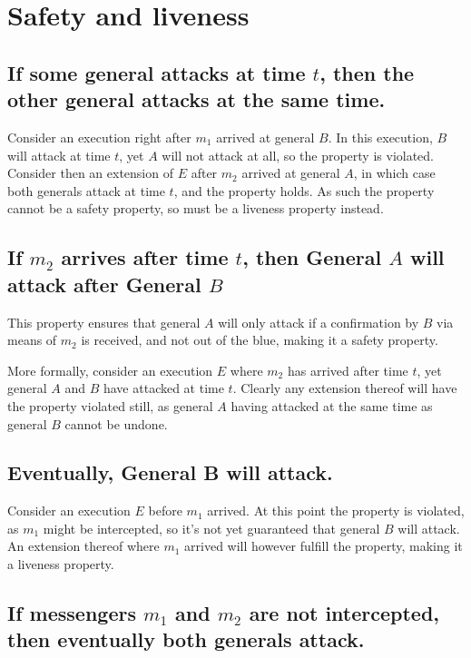 \documentclass[a4paper]{scrreprt}
\begin{document}
\section{Safety and liveness}

\subsection{If some general attacks at time $t$, then the other general attacks at the same time.}
\label{seq:liveness_property}

Consider an execution right after $m_1$ arrived at general $B$. In this
execution, $B$ will attack at time $t$, yet $A$ will not attack at all, so the
property is violated. Consider then an extension of $E$ after $m_2$ arrived at
general $A$, in which case both generals attack at time $t$, and the property
holds. As such the property cannot be a safety property, so must be a liveness
property instead.

\subsection{If $m_2$ arrives after time $t$, then General $A$ will attack after General $B$}

This property ensures that general $A$ will only attack if a confirmation by
$B$ via means of $m_2$ is received, and not out of the blue, making it a safety
property.

More formally, consider an execution $E$ where $m_2$ has arrived after time
$t$, yet general $A$ and $B$ have attacked at time $t$. Clearly any extension
thereof will have the property violated still, as general $A$ having attacked
at the same time as general $B$ cannot be undone.

\subsection{Eventually, General B will attack.}

Consider an execution $E$ before $m_1$ arrived. At this point the property is
violated, as $m_1$ might be intercepted, so it's not yet guaranteed that
general $B$ will attack. An extension thereof where $m_1$ arrived will however
fulfill the property, making it a liveness property.

\subsection{If messengers $m_1$ and $m_2$ are not intercepted, then eventually both generals attack.}
\label{seq:safety_property}
\end{document}
